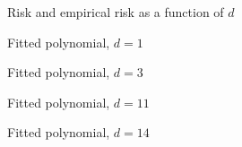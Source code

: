 \begin{frame}

    \begin{figure}
   \begin{center}
    \caption{\label{f:rvempr} Risk and empirical risk as a function of $d$}
   \end{center}
    \end{figure}
    
\end{frame}



\begin{frame}

    \begin{figure}
       \begin{center}
        \caption{\label{f:ofit1} Fitted polynomial, $d=1$}
       \end{center}
    \end{figure}
    
\end{frame}

\begin{frame}

    \begin{figure}
       \begin{center}
        \caption{\label{f:ofit3} Fitted polynomial, $d=3$}
       \end{center}
    \end{figure}
    
\end{frame}

\begin{frame}

    \begin{figure}
       \begin{center}
        \caption{\label{f:ofit11} Fitted polynomial, $d=11$}
       \end{center}
    \end{figure}
    
\end{frame}

\begin{frame}

    \begin{figure}
       \begin{center}
        \caption{\label{f:ofit14} Fitted polynomial, $d=14$}
       \end{center}
    \end{figure}
    
\end{frame}


